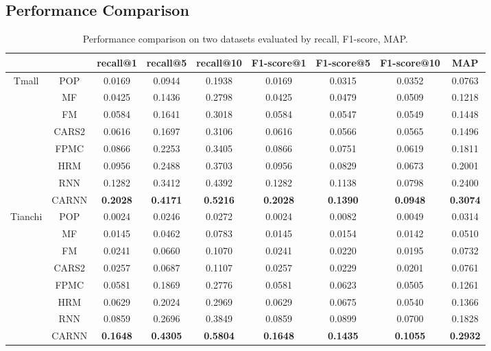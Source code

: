 \documentclass[conference]{IEEEtran}
\begin{document}
\subsection{Performance Comparison}
\begin{table}[htbp]
\centering\scriptsize
\caption{Performance comparison on two datasets evaluated by recall, F1-score, MAP.}
\begin{tabular}{ccccccccc}
    \toprule
          &       & recall@1 & recall@5 & recall@10 & F1-score@1 & F1-score@5 & F1-score@10 & MAP   \\
    \midrule
    \multirow{8}[0]{*}{Tmall} 
        & POP   &0.0169    &0.0944  &0.1938  &0.0169  &0.0315  &0.0352  &0.0763 \\
        & MF    &0.0425   & 0.1436  &0.2798&  0.0425  &0.0479 & 0.0509  &0.1218 \\
        & FM   &0.0584  &0.1641  &0.3018 & 0.0584  &0.0547 & 0.0549 & 0.1448 \\
        & CARS2   &0.0616 & 0.1697  &0.3106 & 0.0616 & 0.0566 & 0.0565 & 0.1496\\
        & FPMC    &0.0866  &0.2253  &0.3405  &0.0866  &0.0751  &0.0619  &0.1811 \\
        & HRM   &0.0956  &0.2488 & 0.3703 & 0.0956 & 0.0829&  0.0673&  0.2001 \\
        & RNN   &0.1282  &0.3412&  0.4392&  0.1282 & 0.1138 &0.0798 & 0.2400 \\
        & CARNN    &\textbf{0.2028}  &\textbf{0.4171}  &\textbf{0.5216}&  \textbf{0.2028}&  \textbf{0.1390}&\textbf{ 0.0948}  &\textbf{0.3074} \\
    \midrule
    \multirow{8}[0]{*}{Tianchi} 
        & POP   &0.0024  &0.0246  & 0.0272  & 0.0024   &0.0082  & 0.0049   &0.0314 \\
        & MF    & 0.0145  & 0.0462  & 0.0783  &0.0145   &0.0154   &0.0142   &0.0510 \\
        & FM   & 0.0241  &0.0660  & 0.1070   &0.0241   &0.0220  & 0.0195  & 0.0732 \\
        & CARS2   &0.0257   &0.0687  & 0.1107   &0.0257  & 0.0229   &0.0201  & 0.0761 \\
        & FPMC    & 0.0581  & 0.1869  & 0.2776  & 0.0581   &0.0623  & 0.0505  & 0.1261 \\
        & HRM   & 0.0629   &0.2024   &0.2969 &  0.0629 &  0.0675 &  0.0540   &0.1366 \\
        & RNN   & 0.0859   &0.2696 &  0.3849  & 0.0859  & 0.0899 &  0.0700   &0.1828 \\
        & CARNN    & \textbf{0.1648}   &\textbf{0.4305}  &\textbf{ 0.5804}   &\textbf{0.1648}   &\textbf{0.1435} &  \textbf{0.1055 }& \textbf{ 0.2932} \\
    \bottomrule
\end{tabular}%
\label{tab:result}%
\end{table}%
\end{document}
